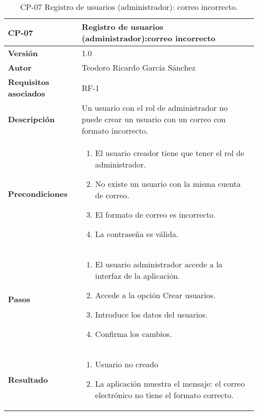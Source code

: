 \begin{table}[p]
	\centering
	\begin{tabularx}{\linewidth}{ p{} p{} }
		\toprule
		\textbf{CP-07}    & \textbf{Registro de usuarios (administrador):correo incorrecto}\\
		\toprule
		\textbf{Versión}              & 1.0    \\
		\textbf{Autor}                & Teodoro Ricardo García Sánchez \\
		\textbf{Requisitos asociados} & RF-1 \\
		\textbf{Descripción}          & Un usuario con el rol de administrador no puede crear un usuario con un correo con formato incorrecto. \\
		\textbf{Precondiciones}         & 
		\begin{enumerate}
			\def\labelenumi{\arabic{enumi}.}
			\tightlist
			\item El usuario creador tiene que tener el rol de administrador.
			\item No existe un usuario con la misma cuenta de correo.
			\item El formato de correo es incorrecto.
			\item La contraseña es válida.
		\end{enumerate}\\
		\textbf{Pasos}             &
		\begin{enumerate}
			\def\labelenumi{\arabic{enumi}.}
			\tightlist
			\item El usuario administrador accede a la interfaz de la aplicación.
			\item Accede a la opción Crear usuarios.
			\item Introduce los datos del usuarios.
			\item Confirma los cambios.
		\end{enumerate}\\
		\textbf{Resultado}          & 
		\begin{enumerate}
			\item Usuario no creado
			\item La aplicación muestra el mensaje: el correo electrónico no tiene el formato correcto.
		\end{enumerate}\\
		\bottomrule
	\end{tabularx}
	\caption{CP-07 Registro de usuarios (administrador): correo incorrecto.}
\end{table}

